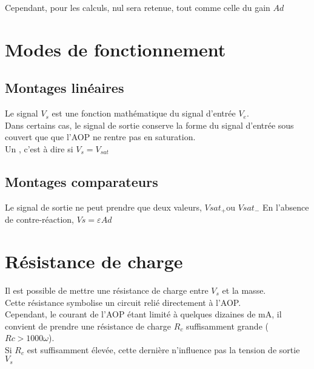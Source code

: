 

Cependant, pour les calculs,  nul sera retenue, tout comme celle du gain $Ad$


\section{ Modes de fonctionnement}


\subsection{Montages linéaires }
Le signal $V_s$ est une fonction mathématique du signal d’entrée $V_e$. \\

Dans certains cas, le signal de sortie conserve la forme du signal d’entrée sous couvert que que l’AOP ne rentre pas en saturation. \\


Un , c’est à dire si $V_s=V_{sat}$




\subsection{Montages comparateurs}

Le signal de sortie ne peut prendre que deux valeurs, $Vsat_+$ou $Vsat_-$
En l’absence de contre-réaction, $Vs=\varepsilon Ad$ \\



\section{Résistance de charge}

Il est possible de mettre une résistance de charge entre $V_s$ et la masse. \\

Cette résistance symbolise un circuit relié directement à l'AOP. \\

Cependant, le courant de l’AOP étant limité à quelques dizaines de mA, il convient de prendre une résistance de charge $R_c$ suffisamment grande ($Rc>1000 \omega$). \\

Si $R_{c}$ est suffisamment élevée, cette dernière n’influence pas la tension de sortie $V_s$ \\




